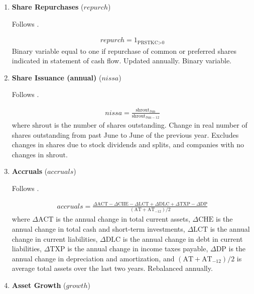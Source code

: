 \begin{enumerate}
	\item \textbf{Share Repurchases} ($repurch$)
	
	Follows . 
	
	\begin{align*}
		repurch = 1_{\text{PRSTKC>0}}
	\end{align*}
	Binary variable equal to one if repurchase of common or preferred shares indicated in statement of cash flow. Updated annually. Binary variable.
	
	
	
	\item \textbf{Share Issuance (annual)} ($nissa$)
	
	Follows . 
	
	\begin{align*}
		nissa = \frac{ \mathrm{shrout}_{\mathrm{Jun}} }{ \mathrm{shrout}_{\mathrm{Jun-12}} }
	\end{align*}	
	where $\mathrm{shrout}$ is the number of shares outstanding. Change in real number of shares outstanding from past June to June of the previous year. Excludes changes in shares due to stock dividends and splits, and companies with no changes in $\mathrm{shrout}$.
	
	
	
	\item \textbf{Accruals} ($accruals$) 
	
	Follows . 
	
	\begin{align*}
		accruals =\frac{\Delta \mathrm{ACT}-\Delta \mathrm{CIIE}-\Delta \mathrm{LCT}+\Delta \mathrm{DLC}+\Delta \mathrm{TXP}-\Delta \mathrm{DP}}{(\mathrm{AT}+\mathrm{AT}_{-12}) / 2}
	\end{align*}
	where $\Delta \mathrm{ACT}$ is the annual change in total current assets, $\Delta \mathrm{CHE}$ is the annual change in total cash and short-term investments, $\Delta \mathrm{LCT}$ is the annual change in current liabilities, $\Delta \mathrm{DLC}$ is the annual change in debt in current liabilities, $\Delta \mathrm{TXP}$ is the annual change in income taxes payable, $\Delta \mathrm{DP}$ is the annual change in depreciation and amortization, and $\left(\mathrm{AT}+\mathrm{AT}_{-12}\right) / 2$ is average total assets over the last two years. Rebalanced annually.
	
	
	
	\item \textbf{Asset Growth} ($growth$) 
	

\end{enumerate}
